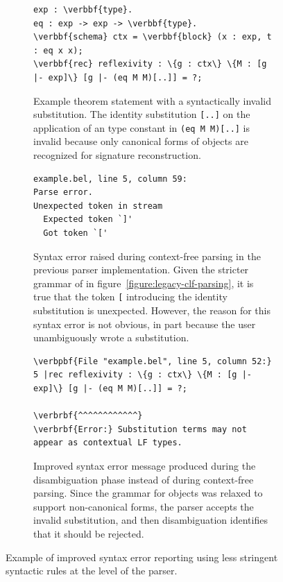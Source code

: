 \begin{figure}[H]
\begin{subfigure}{\linewidth}
\begin{Verbatim}[commandchars=\\\{\}, baselinestretch=1]
exp : \verbbf{type}.
eq : exp -> exp -> \verbbf{type}.
\verbbf{schema} ctx = \verbbf{block} (x : exp, t : eq x x);
\verbbf{rec} reflexivity : \{g : ctx\} \{M : [g |- exp]\} [g |- (eq M M)[..]] = ?;
\end{Verbatim}
\caption{%
Example \Beluga theorem statement with a syntactically invalid substitution.
The identity substitution \texttt{[..]} on the application of an \LF type constant in \texttt{(eq M M)[..]} is invalid because only canonical forms of \LF objects are recognized for signature reconstruction.
}
\end{subfigure}
\par\bigskip
\begin{subfigure}{\linewidth}
\begin{Verbatim}[baselinestretch=1]
example.bel, line 5, column 59:
Parse error.
Unexpected token in stream
  Expected token `]'
  Got token `['
\end{Verbatim}
\caption{%
Syntax error raised during context-free parsing in the previous parser implementation.
Given the stricter grammar of  in figure~\ref{figure:legacy-clf-parsing}, it is true that the token \texttt{[} introducing the identity substitution is unexpected.
However, the reason for this syntax error is not obvious, in part because the user unambiguously wrote a substitution.
}
\end{subfigure}
\par\bigskip
\begin{subfigure}{\linewidth}
\begin{Verbatim}[commandchars=\\\{\}, baselinestretch=1]
\verbpbf{File "example.bel", line 5, column 52:}
5 |rec reflexivity : \{g : ctx\} \{M : [g |- exp]\} [g |- (eq M M)[..]] = ?;
                                                      \verbrbf{^^^^^^^^^^^^}      
\verbrbf{Error:} Substitution terms may not appear as contextual LF types.
\end{Verbatim}
\caption{%
Improved syntax error message produced during the disambiguation phase instead of during context-free parsing.
Since the grammar for \LF objects was relaxed to support non-canonical forms, the parser accepts the invalid substitution, and then disambiguation identifies that it should be rejected.
}
\end{subfigure}
\caption[Example of improved syntax error reporting]{%
Example of improved syntax error reporting using less stringent syntactic rules at the level of the parser.
}
\label{figure:improved-syntax-error-message}
\end{figure}


